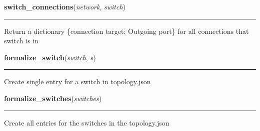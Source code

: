     \label{initialize_system:Write_Jsons:switch_connections}

    \vspace{0.5ex}

\hspace{.8\funcindent}\begin{boxedminipage}{\funcwidth}

    \raggedright \textbf{switch\_connections}(\textit{network}, \textit{switch})

    \vspace{-1.5ex}

    \rule{\textwidth}{0.5\fboxrule}
\setlength{\parskip}{2ex}
    Return a dictionary \{connection target: Outgoing port\} for all 
    connections that switch is in

\setlength{\parskip}{1ex}
    \end{boxedminipage}

    \label{initialize_system:Write_Jsons:formalize_switch}

    \vspace{0.5ex}

\hspace{.8\funcindent}\begin{boxedminipage}{\funcwidth}

    \raggedright \textbf{formalize\_switch}(\textit{switch}, \textit{s})

    \vspace{-1.5ex}

    \rule{\textwidth}{0.5\fboxrule}
\setlength{\parskip}{2ex}
    Create single entry for a switch in topology.json

\setlength{\parskip}{1ex}
    \end{boxedminipage}

    \label{initialize_system:Write_Jsons:formalize_switches}

    \vspace{0.5ex}

\hspace{.8\funcindent}\begin{boxedminipage}{\funcwidth}

    \raggedright \textbf{formalize\_switches}(\textit{switches})

    \vspace{-1.5ex}

    \rule{\textwidth}{0.5\fboxrule}
\setlength{\parskip}{2ex}
    Create all entries for the switches in the topology.json

\setlength{\parskip}{1ex}
    \end{boxedminipage}

